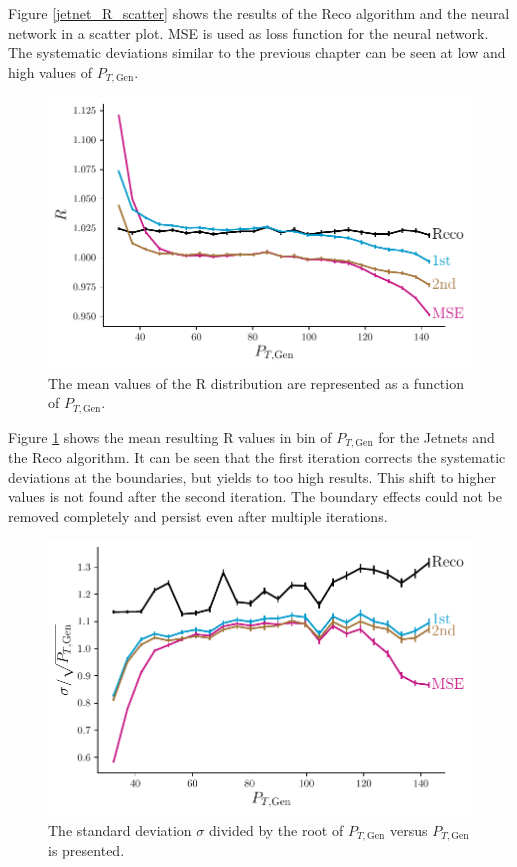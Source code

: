 \documentclass[12pt, a4paper]{thesis}
\begin{document}
Figure \ref{jetnet_R_scatter} shows the results of the Reco algorithm
and the neural network in a scatter plot. MSE is used as loss function
for the neural network. The systematic deviations similar to the
previous chapter can be seen at low and high values of \(P_{T,
  \text{Gen}}\).

 
\begin{figure}[hbtp]
  \includegraphics[width=.9\linewidth]{../images/jetnet_R.pdf}
  \caption{The mean values of the R distribution are represented as a
    function of \(P_{T, \text{Gen}}\).}
  \label{jetnet_R}
\end{figure}

Figure \ref{jetnet_R} shows the mean resulting R values in bin of
\(P_{T, \text{Gen}}\) for the Jetnets and the Reco algorithm. It can
be seen that the first iteration corrects the systematic deviations at
the boundaries, but yields to too high results. This shift to higher
values is not found after the second iteration. The boundary effects
could not be removed completely and persist even after multiple
iterations.

\begin{figure}[hbtp]
  \centering
  \includegraphics[width=.9\linewidth]{../images/jetnet_res.pdf}
  \caption{The standard deviation $\sigma$ divided by the root of \(P_{T, \text{Gen}}\)
    versus \(P_{T, \text{Gen}}\) is presented.}
  \label{jetnet_res}
\end{figure}
\end{document}
